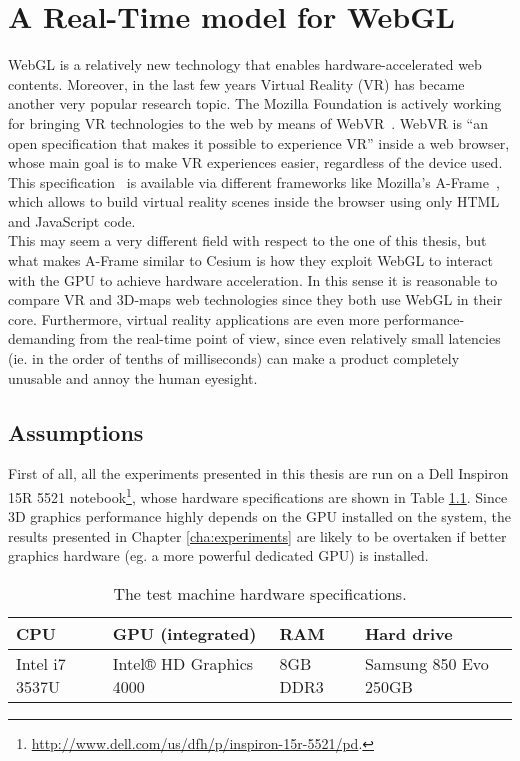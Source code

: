 \chapter{A Real-Time model for WebGL} \label{cha:rt_model}

WebGL is a relatively new technology that enables hardware-accelerated web
contents. Moreover, in the last few years Virtual Reality (VR) has became
another very popular research topic. The Mozilla Foundation is actively working
for bringing VR technologies to the web by means of WebVR~\cite{mozvr}. WebVR is
``an open specification that makes it possible to experience VR'' inside a web
browser, whose main goal is to make VR experiences easier, regardless of the
device used. This specification~\cite{webvrspecs} is available
via different frameworks like Mozilla's A-Frame~\cite{aframe}, which allows
to build virtual reality scenes inside the browser using only HTML and JavaScript
code.\\
This may seem a very different field with respect to the one of this
thesis, but what makes A-Frame similar to Cesium is how they exploit WebGL to
interact with the GPU to achieve hardware acceleration. In this sense it is
reasonable to compare VR and 3D-maps web technologies since they both use WebGL
in their core. Furthermore, virtual reality applications are even more
performance-demanding from the real-time point of view, since even relatively
small latencies (ie. in the order of tenths of milliseconds) can make a product
completely unusable and annoy the human eyesight.


\section{Assumptions} \label{sec:assumptions}
First of all, all the experiments presented in this thesis are run on a Dell
Inspiron 15R 5521 notebook\footnote{\url{http://www.dell.com/us/dfh/p/inspiron-15r-5521/pd}.},
whose hardware specifications are shown in Table \ref{tab:notebook_specs}.
Since 3D graphics performance highly depends on the GPU installed on the system,
the results presented in Chapter \ref{cha:experiments} are likely to be overtaken
if better graphics hardware (eg. a more powerful dedicated GPU) is installed.
\begin{table}[!htb]
    \centering
    \caption{The test machine hardware specifications.}
    \label{tab:notebook_specs}
    \begin{tabular}{|l|l|l|l|}
    \hline
    \multicolumn{1}{|l|}{\textbf{CPU}} & \multicolumn{1}{l|}{\textbf{GPU (integrated)}} & \multicolumn{1}{l|}{\textbf{RAM}} & \multicolumn{1}{l|}{\textbf{Hard drive}} \\ \hline
    Intel i7 3537U & Intel® HD Graphics 4000 & 8GB DDR3 & Samsung 850 Evo 250GB \\ \hline
    \end{tabular}
\end{table}

